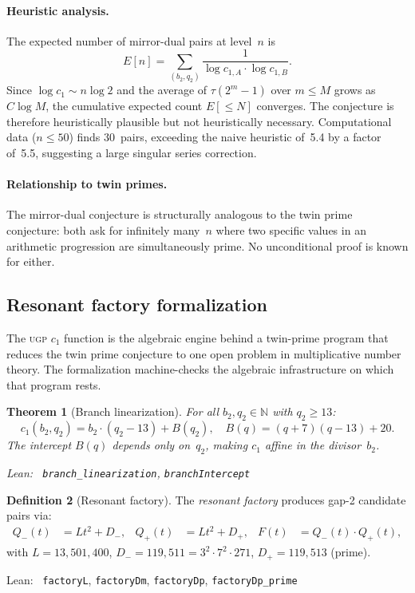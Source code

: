 \documentclass[11pt,a4paper]{article}
\newenvironment{leanref}%
  {\par\smallskip\noindent\begingroup\raggedright\textup{Lean:}~}%
  {\par\endgroup}
\newtheorem{theorem}{Theorem}[section]
\theoremstyle{definition}
\newtheorem{definition}[theorem]{Definition}
\newcommand{\ugp}{\textsc{ugp}}
\newcommand{\N}{\mathbb{N}}
\begin{document}
\paragraph{Heuristic analysis.}
The expected number of mirror-dual pairs at level~$n$ is
\[
  E[n] = \!\!\sum_{(b_2,q_2)}\!\!
  \frac{1}{\log c_{1,A} \cdot \log c_{1,B}}.
\]
Since $\log c_1 \sim n \log 2$ and the average of
$\tau(2^m - 1)$ over $m \le M$ grows as $C \log M$, the cumulative
expected count $E[\le N]$ converges.  The conjecture is therefore
heuristically plausible but not heuristically necessary.
Computational data ($n \le 50$) finds 30~pairs, exceeding the naive
heuristic of~5.4 by a factor of~5.5, suggesting a large singular
series correction.

\paragraph{Relationship to twin primes.}
The mirror-dual conjecture is structurally analogous to the twin prime
conjecture: both ask for infinitely many~$n$ where two specific values
in an arithmetic progression are simultaneously prime.  No unconditional
proof is known for either.

\subsection{Resonant factory formalization}\label{sec:factory}

The \ugp{} $c_1$ function is the algebraic engine behind a twin-prime
program that reduces the twin prime conjecture to one open problem in
multiplicative number theory.  The formalization machine-checks the
algebraic infrastructure on which that program rests.

\begin{theorem}[Branch linearization]\label{thm:branch}
For all $b_2, q_2 \in \N$ with $q_2 \ge 13$:
\[
  c_1(b_2, q_2) = b_2 \cdot (q_2 - 13) + B(q_2),
  \quad B(q) = (q+7)(q-13) + 20.
\]
The intercept $B(q)$ depends only on~$q_2$, making $c_1$ affine in
the divisor~$b_2$.

\begin{leanref} \lstinline|branch_linearization|, \lstinline|branchIntercept|
\end{leanref}
\end{theorem}

\begin{definition}[Resonant factory]\label{def:factory}
The \emph{resonant factory} produces gap-2 candidate pairs via:
\begin{align*}
  Q_-(t) &= Lt^2 + D_-, & Q_+(t) &= Lt^2 + D_+, & F(t) &= Q_-(t) \cdot Q_+(t),
\end{align*}
with $L = 13{,}501{,}400$, $D_- = 119{,}511 = 3^2 \cdot 7^2 \cdot 271$,
$D_+ = 119{,}513$ (prime).

\begin{leanref} \lstinline|factoryL|, \lstinline|factoryDm|,
\lstinline|factoryDp|, \lstinline|factoryDp_prime|
\end{leanref}
\end{definition}
\end{document}

